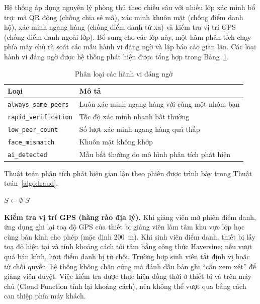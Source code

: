 \documentclass[../main.tex]{subfiles}
\begin{document}
Hệ thống áp dụng nguyên lý phòng thủ theo chiều sâu với nhiều lớp xác minh bổ trợ: mã QR
động (chống chia sẻ mã), xác minh khuôn mặt (chống điểm danh hộ), xác minh ngang hàng
(chống điểm danh từ xa) và kiểm tra vị trí GPS (chống điểm danh ngoài lớp). Bổ sung cho
các lớp này, một hàm phân tích chạy phía máy chủ rà soát các mẫu hành vi đáng ngờ và lập
báo cáo gian lận. Các loại hành vi đáng ngờ được hệ thống phát hiện được tổng hợp trong
Bảng~\ref{tab:fraud}.

\begin{table}[H]
\centering
\small
\caption{Phân loại các hành vi đáng ngờ}
\label{tab:fraud}
\begin{tabular}{|l|p{9cm}|}
\hline
\textbf{Loại} & \textbf{Mô tả} \\
\hline
\texttt{always\_same\_peers} & Luôn xác minh ngang hàng với cùng một nhóm bạn \\ \hline
\texttt{rapid\_verification} & Tốc độ xác minh nhanh bất thường \\ \hline
\texttt{low\_peer\_count} & Số lượt xác minh ngang hàng quá thấp \\ \hline
\texttt{face\_mismatch} & Khuôn mặt không khớp \\ \hline
\texttt{ai\_detected} & Mẫu bất thường do mô hình phân tích phát hiện \\ \hline
\end{tabular}
\end{table}

Thuật toán phân tích phát hiện gian lận theo phiên được trình bày trong
Thuật toán~\ref{algo:fraud}.

\begin{algorithm}[H]
\caption{Phân tích phát hiện gian lận theo phiên}
\label{algo:fraud}
$S \leftarrow \emptyset$\;
\Return $S$\;
\end{algorithm}

\textbf{Kiểm tra vị trí GPS (hàng rào địa lý).} Khi giảng viên mở phiên điểm danh, ứng dụng
ghi lại toạ độ GPS của thiết bị giảng viên làm tâm khu vực lớp học cùng bán kính cho phép
(mặc định 200~m). Khi sinh viên điểm danh, thiết bị lấy toạ độ hiện tại và tính khoảng cách
tới tâm bằng công thức Haversine; nếu vượt quá bán kính, lượt điểm danh bị từ chối. Trường
hợp sinh viên tắt định vị hoặc từ chối quyền, hệ thống không chặn cứng mà đánh dấu bản ghi
``cần xem xét'' để giảng viên duyệt. Việc kiểm tra được thực hiện đồng thời ở thiết bị và
trên máy chủ (Cloud Function tính lại khoảng cách), nên không thể vượt qua bằng cách can
thiệp phía máy khách.
\end{document}
